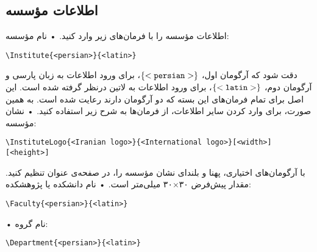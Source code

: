 \documentclass[%
12pt,%
twoside, %
openany, %
notitlepage,%
fleqn,%
]{article}
\numberwithin{equation}{section} %
\begin{document}
\subsection{اطلاعات مؤسسه}
اطلاعات مؤسسه را با فرمان‌های زیر وارد کنید\@. 
• نام مؤسسه:
\begin{latin}\begin{verbatim}
\Institute{<persian>}{<latin>}
\end{verbatim} \end{latin}
دقت شود که آرگومان اول، $\left\lbrace \tt{<persian>} \right\rbrace $، برای ورود اطلاعات به زبان پارسی و آرگومان دوم، $\left\lbrace \tt{<latin>} \right\rbrace $، برای ورود اطلاعات به لاتین درنظر گرفته شده است. این اصل برای تمام فرمان‌های این بسته که دو آرگومان دارند رعایت شده است\@. به همین صورت، برای وارد کردن سایر اطلاعات، از فرمان‌ها به شرح زیر استفاده کنید\@. 
• نشان مؤسسه:
\begin{latin}\small \begin{verbatim}
\InstituteLogo{<Iranian logo>}{<International logo>}[<width>][<height>]
\end{verbatim} \end{latin}
با آرگومان‌های اختیاری، پهنا و بلندای نشان مؤسسه را، در صفحه‌ی عنوان تنظیم کنید. مقدار پیش‌فرض ۳۰×۳۰ میلی‌متر است\@. 
• نام دانشکده یا پژوهشکده:
\begin{latin}\begin{verbatim}
\Faculty{<persian>}{<latin>}
\end{verbatim} \end{latin}
• نام گروه:
\begin{latin}\begin{verbatim}
\Department{<persian>}{<latin>}
\end{verbatim} \end{latin}
\end{document}
